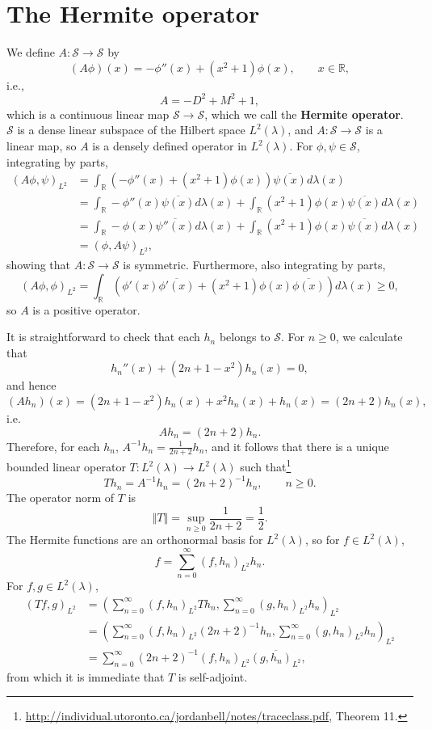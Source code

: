 \documentclass{article}
\newcommand{\norm}[1]{\left\Vert #1 \right\Vert}
\theoremstyle{definition}
\begin{document}
\section{The Hermite operator}
We define
$A:\mathscr{S}\to \mathscr{S}$ by
\[
(A\phi)(x) =-\phi''(x)+(x^2+1) \phi(x),\qquad x \in \mathbb{R},
\]
i.e.,
\[
A = -D^2 +M^2+1,
\]
which is a continuous linear map $\mathscr{S} \to \mathscr{S}$, which we call the \textbf{Hermite operator}. 
$\mathscr{S}$ is a dense linear subspace of the Hilbert space $L^2(\lambda)$, and $A:\mathscr{S} \to \mathscr{S}$ is a linear map, so
$A$ is a densely defined operator in $L^2(\lambda)$.
For $\phi,\psi \in \mathscr{S}$, integrating by parts,
\begin{align*}
(A\phi,\psi)_{L^2}&=\int_{\mathbb{R}} (-\phi''(x)+(x^2+1) \phi(x))\overline{\psi(x)} d\lambda(x)\\
&=\int_{\mathbb{R}} -\phi''(x) \overline{\psi(x)} d\lambda(x)+
\int_{\mathbb{R}} (x^2+1)\phi(x) \overline{\psi(x)} d\lambda(x)\\
&=\int_{\mathbb{R}} -\phi(x) \overline{\psi''(x)} d\lambda(x)+\int_{\mathbb{R}}
(x^2+1)\phi(x)\overline{\psi(x)} d\lambda(x)\\
&=(\phi,A\psi)_{L^2},
\end{align*}
showing that $A:\mathscr{S} \to \mathscr{S}$ is symmetric. 
Furthermore, also integrating by parts,
\[
(A\phi,\phi)_{L^2} = \int_{\mathbb{R}} (\phi'(x)\overline{\phi'(x)}+(x^2+1)\phi(x)\overline{\phi(x)}) d\lambda(x)
\geq 0,
\]
so $A$ is a positive operator.


It is straightforward to check that each $h_n$ belongs to $\mathscr{S}$.
For $n \geq 0$, we calculate that
\[
h_n''(x)+(2n+1-x^2)h_n(x)=0,
\]
and hence
\[
(Ah_n)(x) = (2n+1-x^2)h_n(x)+x^2h_n(x)+h_n(x)=(2n+2)h_n(x),
\]
i.e.
\[
Ah_n=(2n+2)h_n.
\]
Therefore, for each $h_n$, $A^{-1}h_n=\frac{1}{2n+2}h_n$, and it follows that there is
a unique bounded linear
operator
$T:L^2(\lambda) \to L^2(\lambda)$ 
 such that\footnote{\url{http://individual.utoronto.ca/jordanbell/notes/traceclass.pdf},
Theorem 11.}
\begin{equation}
 Th_n=A^{-1}h_n=(2n+2)^{-1}h_n,\qquad n \geq 0.
 \label{Ainverse}
\end{equation}
The operator norm of $T$ is
\[
\norm{T} = \sup_{n \geq 0} \frac{1}{2n+2} = \frac{1}{2}.
\]
The Hermite functions are an orthonormal basis for $L^2(\lambda)$, so for $f \in L^2(\lambda)$,
\[
f = \sum_{n=0}^\infty (f,h_n)_{L^2} h_n.
\]
For $f,g \in L^2(\lambda)$, 
\begin{align*}
(Tf,g)_{L^2}&=\left( \sum_{n=0}^\infty (f,h_n)_{L^2} Th_n, \sum_{n=0}^\infty (g,h_n)_{L^2} h_n\right)_{L^2}\\
&=\left( \sum_{n=0}^\infty (f,h_n)_{L^2} (2n+2)^{-1} h_n, \sum_{n=0}^\infty (g,h_n)_{L^2} h_n\right)_{L^2}\\
&=\sum_{n=0}^\infty (2n+2)^{-1} (f,h_n)_{L^2} \overline{(g,h_n)_{L^2}},
\end{align*}
from which it is immediate that $T$ is self-adjoint. 
\end{document}
